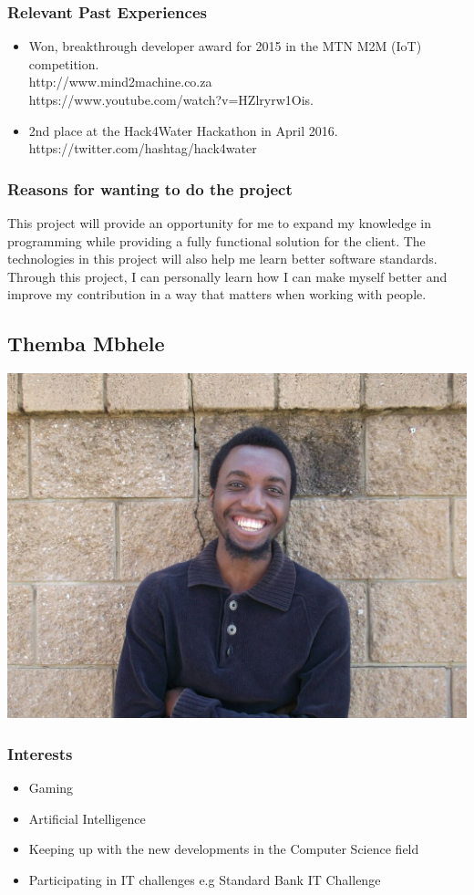 \documentclass[a4paper,12pt]{article}
\begin{document}
\subsubsection{Relevant Past Experiences}
\begin{itemize}
\item Won, breakthrough developer award for 2015 in the MTN M2M (IoT) competition.\\
http://www.mind2machine.co.za \\
https://www.youtube.com/watch?v=HZlryrw1Ois.
\item 2nd place at the Hack4Water Hackathon in April 2016.\\
https://twitter.com/hashtag/hack4water
\end{itemize}
\subsubsection{Reasons for wanting to do the project}
This project will provide an opportunity for me to expand my knowledge in programming while providing a fully functional solution for the client. The technologies in this project will also help me learn better software standards. Through this project, I can personally learn how I can make myself better and improve my contribution in a way that matters when working with people.
\newpage
\subsection{Themba Mbhele}
\includegraphics[width=\textwidth]{images/Themba}
\subsubsection{Interests}
\begin{itemize}
    \item Gaming
    \item Artificial Intelligence
    \item Keeping up with the new developments in the Computer Science field
    \item Participating in IT challenges e.g Standard Bank IT Challenge
\end{itemize}
\end{document}
